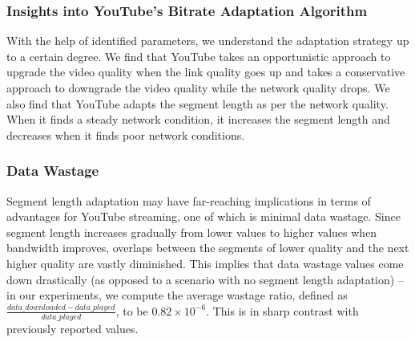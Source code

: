 \subsubsection{Insights into YouTube’s Bitrate Adaptation Algorithm}
With the help of identified parameters, we understand the adaptation strategy up to a certain degree. We find that YouTube takes an opportunistic approach to upgrade the video quality when the link quality goes up and takes a conservative approach to downgrade the video quality while the network quality drops. We also find that YouTube adapts the segment length as per the network quality. When it finds a steady network condition, it increases the segment length and decreases when it finds poor network conditions.
\subsubsection{Data Wastage}
Segment length adaptation may have far-reaching implications in terms of advantages for YouTube streaming, one of which is minimal data wastage. Since segment length increases gradually from lower values to higher values when bandwidth improves, overlaps between the segments of lower quality and the next higher quality are vastly diminished. This implies that data wastage values come down drastically (as opposed to a scenario with no segment length adaptation) – in our experiments, we compute the average wastage ratio, defined as $\frac{data\_downloaded - data\_played}{data\_played}$, to be $0.82\times10^{-6}$. This is in sharp contrast with previously reported values.
